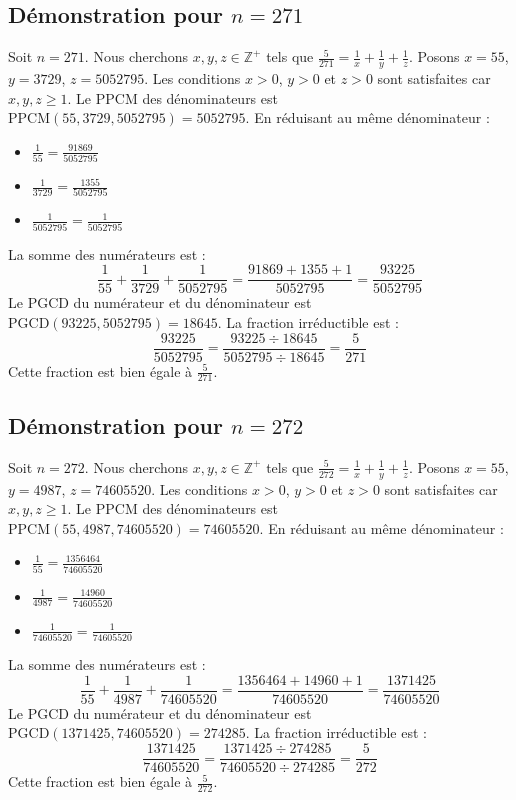 \documentclass[11pt,a4paper]{article}
\begin{document}
\subsection{Démonstration pour $n = 271$}
Soit $n = 271$. Nous cherchons $x, y, z \in \mathbb{Z}^{+}$ tels que $\frac{5}{271} = \frac{1}{x} + \frac{1}{y} + \frac{1}{z}$.
Posons $x = 55$, $y = 3729$, $z = 5052795$.
Les conditions $x > 0$, $y > 0$ et $z > 0$ sont satisfaites car $x, y, z \geq 1$.
Le PPCM des dénominateurs est $\text{PPCM}(55, 3729, 5052795) = 5052795$.
En réduisant au même dénominateur :
\begin{itemize}
    \item $\frac{1}{55} = \frac{91869}{5052795}$
    \item $\frac{1}{3729} = \frac{1355}{5052795}$
    \item $\frac{1}{5052795} = \frac{1}{5052795}$
\end{itemize}
La somme des numérateurs est :
$$ \frac{1}{55} + \frac{1}{3729} + \frac{1}{5052795} = \frac{91869 + 1355 + 1}{5052795} = \frac{93225}{5052795} $$
Le PGCD du numérateur et du dénominateur est $\text{PGCD}(93225, 5052795) = 18645$.
La fraction irréductible est :
$$ \frac{93225}{5052795} = \frac{93225 \div 18645}{5052795 \div 18645} = \frac{5}{271} $$
Cette fraction est bien égale à $\frac{5}{271}$.

\subsection{Démonstration pour $n = 272$}
Soit $n = 272$. Nous cherchons $x, y, z \in \mathbb{Z}^{+}$ tels que $\frac{5}{272} = \frac{1}{x} + \frac{1}{y} + \frac{1}{z}$.
Posons $x = 55$, $y = 4987$, $z = 74605520$.
Les conditions $x > 0$, $y > 0$ et $z > 0$ sont satisfaites car $x, y, z \geq 1$.
Le PPCM des dénominateurs est $\text{PPCM}(55, 4987, 74605520) = 74605520$.
En réduisant au même dénominateur :
\begin{itemize}
    \item $\frac{1}{55} = \frac{1356464}{74605520}$
    \item $\frac{1}{4987} = \frac{14960}{74605520}$
    \item $\frac{1}{74605520} = \frac{1}{74605520}$
\end{itemize}
La somme des numérateurs est :
$$ \frac{1}{55} + \frac{1}{4987} + \frac{1}{74605520} = \frac{1356464 + 14960 + 1}{74605520} = \frac{1371425}{74605520} $$
Le PGCD du numérateur et du dénominateur est $\text{PGCD}(1371425, 74605520) = 274285$.
La fraction irréductible est :
$$ \frac{1371425}{74605520} = \frac{1371425 \div 274285}{74605520 \div 274285} = \frac{5}{272} $$
Cette fraction est bien égale à $\frac{5}{272}$.
\end{document}
